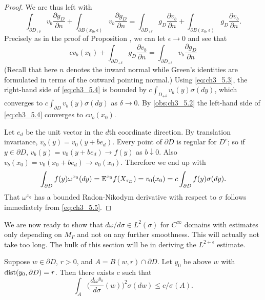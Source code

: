 \begin{proof}
We are thus left with
\[
    \int_{\partial D_{+\delta}} v_b\frac{\partial g_D}{\partial n} + \int_{\partial B(x_0,\epsilon)} v_b\frac{\partial g_D}{\partial n} = \int_{\partial D_{+\delta}} g_D\frac{\partial v_b}{\partial n} + \int_{\partial B(x_0,\epsilon)} g_D\frac{\partial v_b}{\partial n}.
\]
Precisely as in the proof of Proposition , we can let $\epsilon \to 0$ and see that
\begin{equation}\label{eq:ch3_5.4}
    cv_b(x_0) + \int_{\partial D_{+\delta}} g_D\frac{\partial v_b}{\partial n} = \int_{\partial D_{+\delta}} v_b\frac{\partial g_D}{\partial n}
\end{equation}
(Recall that here $n$ denotes the inward normal while Green's identities are formulated in terms of the outward pointing normal.) Using \eqref{eq:ch3_5.3}, the right-hand side of \eqref{eq:ch3_5.4} is bounded by $c\int_{D_{+\delta}} v_b(y)\sigma(dy)$, which converges to $c\int_{\partial D} v_b(y)\sigma(dy)$ as $\delta \to 0$. By \eqref{obs:ch3_5.2} the left-hand side of \eqref{eq:ch3_5.4} converges to $cv_b(x_0)$.


Let $e_d$ be the unit vector in the $d$th coordinate direction. By translation invariance, $v_b(y) = v_0(y + be_d)$. Every point of $\partial D$ is regular for $D^c$; so if $y \in \partial D$, $v_b(y) = v_0(y + be_d) \to f(y)$ as $b \downarrow 0$. Also $v_b(x_0) = v_0(x_0 + be_d) \to v_0(x_0)$. Therefore we end up with
\mpagebreak
\begin{equation}\label{eq:ch3_5.5}
    \int_{\partial D} f(y)\omega^{x_0}(dy) = \mathbb{E}^{x_0}f(X_{\tau_D}) = v_0(x_0) = c\int_{\partial D} f(y)\sigma(dy).
\end{equation}
That $\omega^{x_0}$ has a bounded Radon-Nikodym derivative with respect to $\sigma$ follows immediately from \eqref{eq:ch3_5.5}.
\end{proof}


We are now ready to show that $d\omega/d\sigma \in L^2(\sigma)$ for $C^\infty$ domains with estimates only depending on $M_\Gamma$ and not on any further smoothness. This will actually not take too long. The bulk of this section will be in deriving the $L^{2+\epsilon}$ estimate.

\begin{proposition}\label{prop:ch3_5.3}
Suppose $w \in \partial D$, $r > 0$, and $A = B(w,r) \cap \partial D$. Let $y_0$ be above $w$ with $\operatorname{dist}(y_0,\partial D) = r$. Then there exists $c$ such that
\begin{equation}\label{eq:ch3_5.6}
    \int_A \Big(\frac{d\omega^{y_0}}{d\sigma}(w)\Big)^2\sigma(dw) \leq c/\sigma(A).
\end{equation}
\end{proposition}

